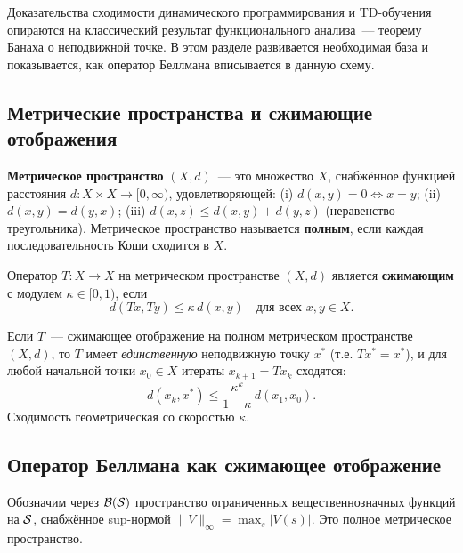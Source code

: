 Доказательства сходимости динамического программирования и TD-обучения опираются на классический результат функционального анализа~--- теорему Банаха о неподвижной точке. В этом разделе развивается необходимая база и показывается, как оператор Беллмана вписывается в данную схему.

\subsection*{Метрические пространства и сжимающие отображения}

\begin{definition}
\label{def:metric-space}
\textbf{Метрическое пространство} $(X, d)$~--- это множество $X$, снабжённое функцией расстояния $d: X \times X \to [0,\infty)$, удовлетворяющей: (i) $d(x,y)=0 \Leftrightarrow x=y$; (ii) $d(x,y)=d(y,x)$; (iii) $d(x,z) \leq d(x,y)+d(y,z)$ (неравенство треугольника). Метрическое пространство называется \textbf{полным}, если каждая последовательность Коши сходится в $X$.
\end{definition}

\begin{definition}
\label{def:contraction}
Оператор $T: X \to X$ на метрическом пространстве $(X,d)$ является \textbf{сжимающим} с модулем $\kappa \in [0,1)$, если
\[
    d(Tx, Ty) \leq \kappa\, d(x, y) \quad \mbox{для всех } x, y \in X.
\]
\end{definition}

\begin{theorem}
\label{thm:banach}
Если $T$~--- сжимающее отображение на полном метрическом пространстве $(X,d)$, то $T$ имеет \emph{единственную} неподвижную точку $x^*$ (т.е. $Tx^* = x^*$), и для любой начальной точки $x_0 \in X$ итераты $x_{k+1} = T x_k$ сходятся:
\[
    d(x_k, x^*) \leq \frac{\kappa^k}{1-\kappa}\,d(x_1, x_0).
\]
Сходимость геометрическая со скоростью $\kappa$.
\end{theorem}

\subsection*{Оператор Беллмана как сжимающее отображение}

Обозначим через $\mathcal{B}(\mathcal{S})$ пространство ограниченных вещественнозначных функций на $\mathcal{S}$, снабжённое sup-нормой $\|V\|_\infty = \max_s |V(s)|$. Это полное метрическое пространство.

